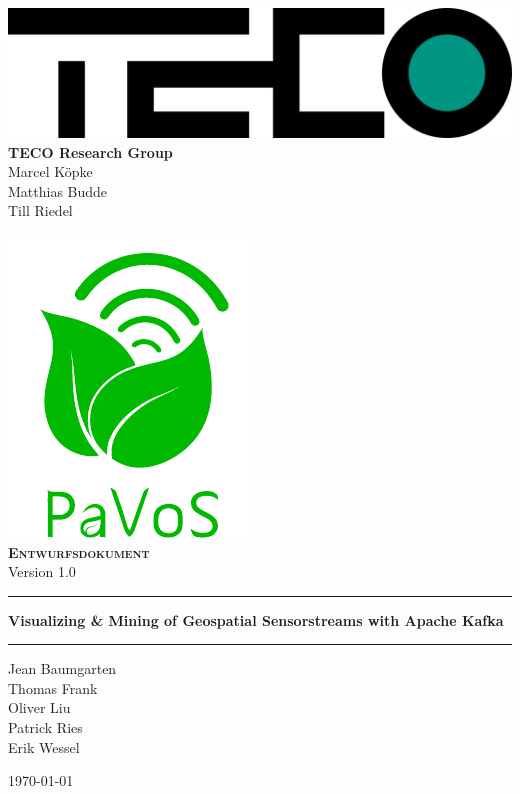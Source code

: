\begin{titlepage}
	\begin{center}
	\includegraphics[width=0.4\linewidth]{images/TECOLogo.png}\\[0.2cm]

	\textbf{TECO Research Group}\\[0.2cm]
	Marcel Köpke\\Matthias Budde\\Till Riedel\\
	\vspace{1cm}
	
	\includegraphics[width=0.25\linewidth]{images/PaVoSLogo-Erweitert}\\[1cm]
	
	\textsc{\textbf{\LARGE Entwurfsdokument}}\\
	{\small Version 1.0}\\
	
	\vspace{1cm}\hrule\vspace{0.4cm}
	\textbf{\huge Visualizing \& Mining of Geospatial Sensorstreams with Apache Kafka}\\
	\vspace{0.4cm}\hrule\vspace{1cm}
	
	{\Large Jean Baumgarten\\
	Thomas Frank\\
	Oliver Liu\\
	Patrick Ries\\
	Erik Wessel\\}

	\vspace{1cm}
	\today
	
	\end{center}
\end{titlepage}